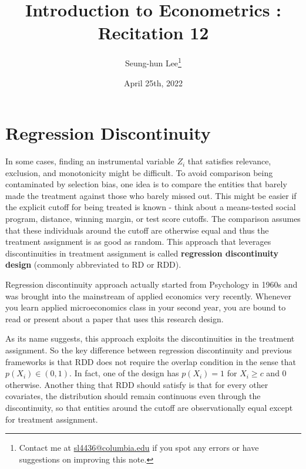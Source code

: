 \documentclass[12pt]{article}
\title{Introduction to Econometrics \ROM{2}: Recitation 12}
\theoremstyle{definition}
\theoremstyle{property}
\theoremstyle{assumption}
\theoremstyle{example}
\theoremstyle{comment}
\begin{document}
\linespread{1.25}
\onehalfspacing

\author{Seung-hun Lee\footnote{Contact me at \href{mailto:sl4436@columbia.edu}{sl4436@columbia.edu} if you spot any errors or have suggestions on improving this note.}}
\date{April 25th, 2022}
\maketitle
\thispagestyle{firstpage}


\section{Regression Discontinuity}
In some cases, finding an instrumental variable $Z_i$ that satisfies relevance, exclusion, and monotonicity might be difficult. To avoid comparison being contaminated by selection bias, one idea is to compare the entities that barely made the treatment against those who barely missed out. This might be easier if the explicit cutoff for being treated is known - think about a means-tested social program, distance, winning margin, or test score cutoffs. The comparison assumes that these individuals around the cutoff are otherwise equal and thus the treatment assignment is as good as random.  This approach that leverages discontinuities in treatment assignment is called \textbf{regression discontinuity design} (commonly abbreviated to RD or RDD). \par
Regression discontinuity approach actually started from Psychology in 1960s and was brought into the mainstream of applied economics very recently. Whenever you learn applied microeconomics class in your second year, you are bound to read or present about a paper that uses this research design. \par
As its name suggests, this approach exploits the discontinuities in the treatment assignment. So the key difference between regression discontinuity and previous frameworks is that RDD does not require the overlap condition in the sense that $p(X_i)\in(0,1)$. In fact, one of the design has $p(X_i)=1$ for $X_i\geq c$ and $0$ otherwise. Another thing that RDD should satisfy is that for every other covariates, the distribution should remain continuous even through the discontinuity, so that entities around the cutoff are observationally equal except for treatment assignment.\par
\end{document}
